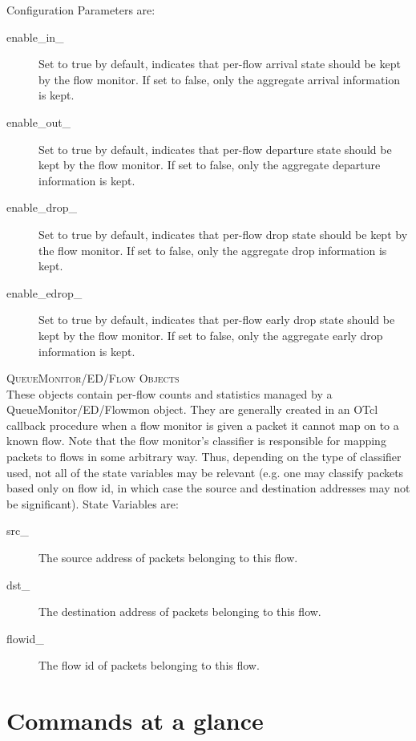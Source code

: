 Configuration Parameters are:
\begin{description}
\item[enable\_in\_] Set to true by default, indicates that per-flow
arrival state should be kept by the flow monitor. If set to false, only
the aggregate arrival information is kept. 

\item[enable\_out\_]
Set to true by default, indicates that per-flow departure state should be
kept by the flow monitor. If set to false, only the aggregate departure
information is kept. 

\item[enable\_drop\_]
Set to true by default, indicates that per-flow drop state should be kept
by the flow monitor. If set to false, only the aggregate drop information
is kept. 

\item[enable\_edrop\_]
Set to true by default, indicates that per-flow early drop state should be
kept by the flow monitor. If set to false, only the aggregate early drop
information is kept. 
\end{description}


\textsc{QueueMonitor/ED/Flow Objects}\\
These objects contain per-flow counts and statistics managed by a
QueueMonitor/ED/Flowmon object. They are generally created in an OTcl
callback procedure when a flow monitor is given a packet it cannot map on
to a known flow. Note that the flow monitor's classifier is responsible
for mapping packets to flows in some arbitrary way. Thus, depending on the
type of classifier used, not all of the state variables may be relevant
(e.g. one may classify packets based only on flow id, in which case the
source and destination addresses may not be significant). 
State Variables are:
\begin{description}
\item[src\_] The source address of packets belonging to this flow. 

\item[dst\_] The destination address of packets belonging to this flow. 

\item[flowid\_] The flow id of packets belonging to this flow. 
\end{description}

\section{Commands at a glance}
\label{sec:queuecommand}

